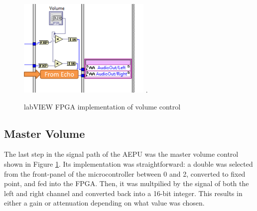 \begin{figure}[!t]
\centering
\includegraphics[width=2.5in]{volume.png}
\DeclareGraphicsExtensions.
\caption{labVIEW FPGA implementation of volume control}
\label{fig_volume}
\end{figure} 

\subsection{Master Volume}

The last step in the signal path of the AEPU was the master volume control shown in Figure \ref{fig_volume}.
Its implementation was straightforward: a double was selected from the front-panel of the microcontroller between 0 and 2, converted to fixed point, and fed into the FPGA.
Then, it was multpilied by the signal of both the left and right channel and converted back into a 16-bit integer.
This results in either a gain or attenuation depending on what value was chosen.

%
%

